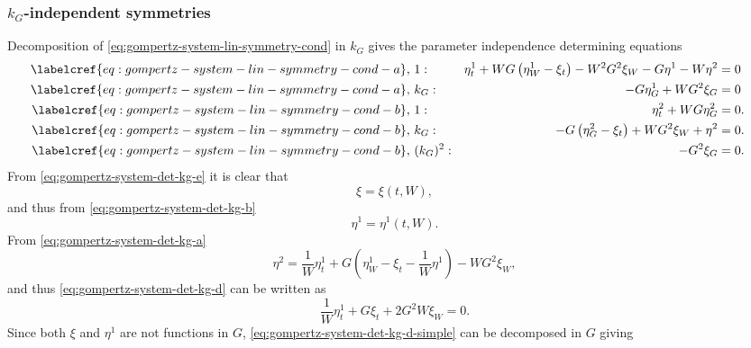 \subsubsection{\texorpdfstring{\(k_G\)-independent symmetries}{Growth rate-independent symmetries}}

Decomposition of \cref{eq:gompertz-system-lin-symmetry-cond} in \(k_G\) gives the parameter independence determining equations
\begin{subequations}
  \begin{flalign}
    \labelcref{eq:gompertz-system-lin-symmetry-cond-a},\ & 1 : & \eta^1_t + W G \left(\eta^1_W - \xi_t\right) - W^2 G^2 \xi_W - G \eta^1 - W \eta^2 &= 0 && \FlLabel{eq:gompertz-system-det-kg-a}\\
    \labelcref{eq:gompertz-system-lin-symmetry-cond-a},\ & k_G : & - G \eta^1_G + W G^2 \xi_G &= 0 && \FlLabel{eq:gompertz-system-det-kg-b}\\
    \labelcref{eq:gompertz-system-lin-symmetry-cond-b},\ & 1 : & \eta^2_t + W G \eta^2_G &= 0. && \FlLabel{eq:gompertz-system-det-kg-c} \\
    \labelcref{eq:gompertz-system-lin-symmetry-cond-b},\ & k_G : & - G \left(\eta^2_G - \xi_t\right) + W G^2 \xi_W + \eta^2 &= 0. && \FlLabel{eq:gompertz-system-det-kg-d} \\
    \labelcref{eq:gompertz-system-lin-symmetry-cond-b},\ & (k_G)^2 : & - G^2 \xi_G &= 0. && \FlLabel{eq:gompertz-system-det-kg-e}
  \end{flalign}
\end{subequations}
From \cref{eq:gompertz-system-det-kg-e} it is clear that
\begin{equation}
  \xi = \xi(t, W),
\end{equation}
and thus from \cref{eq:gompertz-system-det-kg-b}
\begin{equation}
  \eta^1 = \eta^1(t, W).
\end{equation}
From \cref{eq:gompertz-system-det-kg-a}
\begin{equation}
  \eta^2 = \frac{1}{W}\eta^1_t + G \left(\eta^1_W - \xi_t - \frac{1}{W} \eta^1 \right) - W G^2 \xi_W,
\end{equation}
and thus \cref{eq:gompertz-system-det-kg-d} can be written as
\begin{equation}\label{eq:gompertz-system-det-kg-d-simple}
  \frac{1}{W}\eta^1_t + G \xi_t + 2 G^2 W \xi_W = 0.
\end{equation}
Since both \(\xi\) and \(\eta^1\) are not functions in \(G\), \cref{eq:gompertz-system-det-kg-d-simple} can be decomposed in \(G\) giving
